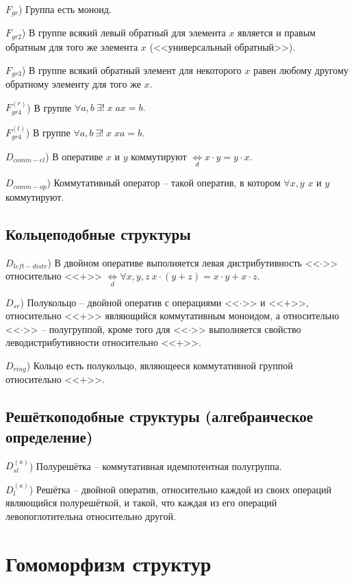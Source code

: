 \documentclass[a4paper]{article}
\newcommand{\Def}[0]{\underset{d}{\Leftrightarrow}}
\begin{document}
$F_{gr}$) Группа есть моноид.

$F_{gr2}$) В группе всякий левый обратный для элемента $x$ является и правым обратным для того же элемента $x$ (<<универсальный обратный>>).

$F_{gr3}$) В группе всякий обратный элемент для некоторого $x$ равен любому другому обратному элементу для того же $x$.

$F_{gr4}^{(r)}$) В группе $\forall a, b~\exists ! \; x \; ax = b.$

$F_{gr4}^{(l)}$) В группе $\forall a, b~\exists ! \; x \; xa = b.$

$D_{comm-el}$) В оперативе $x$ и $y$ коммутируют $\Def x \cdot y = y \cdot x.$

$D_{comm-op}$) Коммутативный оператор -- такой оператив, в котором $\forall x, y$ $x$ и $y$ коммутируют.

\subsection{Кольцеподобные структуры}

$D_{left-distr}$) В двойном оперативе выполняется левая дистрибутивность <<$\cdot$>> относительно <<$+$>> $\Def \forall x, y, z~x \cdot (y+z) = x \cdot y + x \cdot z.$

$D_{sr}$) Полукольцо -- двойной оператив с операциями <<$\cdot$>> и <<$+$>>, относительно <<$+$>> являющийся коммутативным моноидом, а относительно <<$\cdot$>> -- полугруппой, кроме того для <<$\cdot$>> выполняется свойство леводистрибутивности относительно <<$+$>>.

$D_{ring}$) Кольцо есть полукольцо, являющееся коммутативной группой относительно <<$+$>>.

\subsection{Решёткоподобные структуры (алгебраическое определение)}

$D_{sl}^{(a)}$) Полурешётка -- коммутативная идемпотентная полугруппа.

$D_{l}^{(a)}$) Решётка -- двойной оператив, относительно каждой из своих операций являющийся полурешёткой, и такой, что каждая из его операций левопоглотительна относительно другой.


\section{Гомоморфизм структур}
\end{document}
